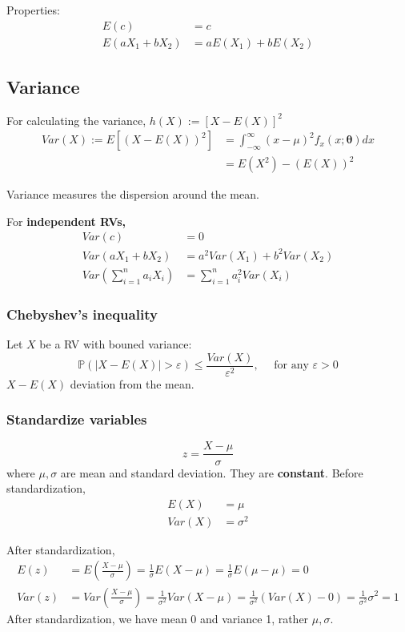 \documentclass[12pt]{article}
\begin{document}
Properties:
\begin{align*}
E(c)&= c\\
E(aX_1 + bX_2)&= aE(X_1) + bE(X_2)
\end{align*}




\subsection{Variance}
For calculating the variance, $ h(X):= [X - E(X)]^{2} $
\begin{align*}
	Var(X):=E[(X - E(X))^{2}] &= \int_{ - \infty }^{\infty }(x - \mu)^{2}f_{x}(x;\bm{\theta})dx \\
	&= E(X^{2}) - (E(X))^{2}
\end{align*}

Variance measures the dispersion around the mean.

For {\textbf {independent RVs,}}
\begin{align*}
Var(c) &= 0\\
Var(aX_1 + bX_2)&= a^{2}Var(X_1) + b^{2}Var(X_2)\\
Var \left( \sum\limits_{i = 1} ^n a_{i}X_{i}	 \right) &= \sum\limits_{i = 1} ^n a_{i}^{2}Var(X_{i})	
\end{align*}


\subsubsection{Chebyshev's inequality}
Let $ X $ be a RV with bouned variance:
\begin{equation*}
\mathbb{P}\left( \left\lvert X - E(X) \right\rvert > \varepsilon  \right) \le 
\frac{Var(X)}{\varepsilon^{2}}, \quad \text{ for any } \varepsilon > 0
\end{equation*}
$ X - E(X) $ deviation from the mean.


\subsubsection{Standardize variables}

\begin{equation*}
z = \frac{X - \mu}{\sigma}
\end{equation*}
where $ \mu , \sigma $ are mean and standard deviation. They are {\textbf {constant}}.
Before standardization, 
\begin{align*}
E(X) &= \mu\\
Var(X) &= \sigma^{2}
\end{align*}

After standardization,
\begin{align*}
E(z) &= E \left( \frac{X - \mu}{\sigma} \right)  = \frac{1}{\sigma}E(X - \mu) = \frac{1}{\sigma}
E(\mu - \mu) = 0\\
Var(z)&= Var \left( \frac{X - \mu}{\sigma} \right) = \frac{1}{\sigma^{2}}Var(X - \mu)=
\frac{1}{\sigma^{2}}(Var(X) - 0) = \frac{1}{\sigma^{2}}\sigma^{2} = 1
\end{align*}
After standardization, we have mean 0 and variance 1, rather $ \mu, \sigma $.







\end{document}
